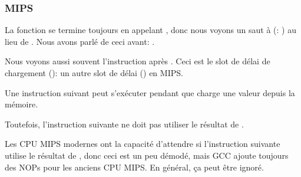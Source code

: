 \subsubsection{MIPS}




La fonction se termine toujours en appelant \puts, donc nous voyons un saut à \puts
(: ) au lieu de .
Nous avons parlé de ceci avant: .

Nous voyons aussi souvent l'instruction  après .
Ceci est le slot de délai de chargement (): un autre slot de
délai () en MIPS.

Une instruction suivant  peut s'exécuter pendant que  charge une
valeur depuis la mémoire.

Toutefois, l'instruction suivante ne doit pas utiliser le résultat de .

Les CPU MIPS modernes ont la capacité d'attendre si l'instruction suivante utilise
le résultat de , donc ceci est un peu démodé, mais GCC ajoute toujours
des NOPs pour les anciens CPU MIPS.
En général, ça peut être ignoré.
